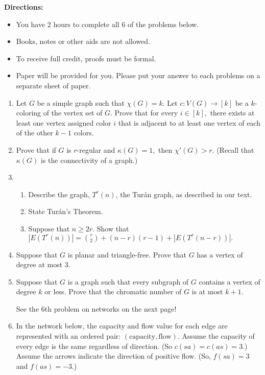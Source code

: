 \documentclass[12pt]{article}
\begin{document}
\textbf{Directions:} 
\begin{itemize}
	\item You have 2 hours to complete all 6 of the problems below. 
	\item Books, notes or other aids are not allowed. 
	\item To receive full credit, proofs must be formal.
	\item Paper will be provided for you. Please put your answer to each problems on a separate sheet of paper.
\end{itemize}

\hrulefill

\begin{enumerate}

\item Let $G$ be a simple graph such that  $\chi(G)=k.$ Let $c: V(G) \to [k]$ be a $k$-coloring of the vertex set of $G.$ Prove that for every $i \in [k],$ there exists at least one vertex assigned color $i$ that is adjacent to at least one vertex of each of the other $k-1$ colors.

\item Prove that if $G$ is $r$-regular and $\kappa(G)=1,$ then $\chi'(G) > r.$ (Recall that $\kappa(G)$ is the connectivity of a graph.)

\item 
	\begin{enumerate}
	\item Describe the graph, $T^r(n)$, the Tur\'{a}n graph, as described in our text.
	\item State Tur\'{a}n's Theorem.
	\item Suppose that $n\geq 2r.$ Show that $|E(T^r(n))|={ r \choose 2}+(n-r)(r-1) +|E(T^r(n-r))|.$
	\end{enumerate}
\item Suppose that $G$ is planar and triangle-free. Prove that $G$ has a vertex of degree at most 3.

\item Suppose that $G$ is a graph such that every subgraph of $G$ contains a vertex of degree $k$ or less. Prove that the chromatic number of $G$ is at most $k+1.$

\vfill

See the 6th problem on networks on the next page!

\vfill

\newpage
\item In the network below, the capacity and flow value for each edge are represented with an ordered pair: $(\text{capacity},\text{flow}).$ Assume the capacity of every edge is the same regardless of direction. (So $c(sa)=c(as)=3.$) Assume the arrows indicate the direction of positive flow. (So, $f(sa)=3$ and $f(as)=-3.$)


\end{enumerate}
\end{document}
